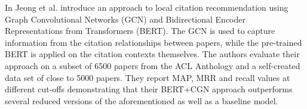 In \cite{Jeong2019} Jeong et al. introduce an approach to local citation recommendation using Graph Convolutional Networks (GCN) and Bidirectional Encoder Representations from Transformers (BERT). The GCN is used to capture information from the citation relationships between papers, while the pre-trained BERT is applied on the citation contexts themselves. The authors evaluate their approach on a subset of 6500 papers from the ACL Anthology and a self-created data set of close to 5000 papers. They report MAP, MRR and recall values at different cut-offs demonstrating that their BERT+CGN approach outperforms several reduced versions of the aforementioned as well as a baseline model.
